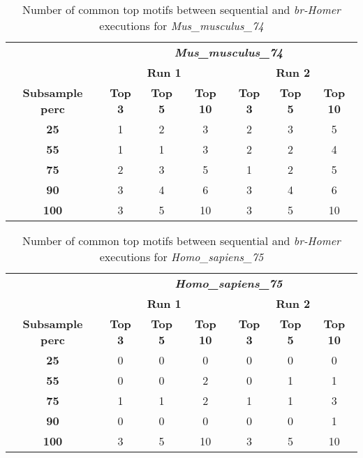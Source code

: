 \documentclass{acm_proc_article-sp}
\begin{document}
\begin{table*}[h]
\centering
\begin{tabular}{c|c|c|c|c|c|c|}
\cline{2-7}
\textbf{} & \multicolumn{6}{c|}{\textit{\textbf{Mus\_musculus\_74}}} \\ \cline{2-7} 
\textbf{} & \multicolumn{3}{c|}{\textbf{Run 1}} & \multicolumn{3}{c|}{\textbf{Run 2}} \\ \hline
\multicolumn{1}{|c|}{\textbf{Subsample perc}} & \textbf{Top 3} & \textbf{Top 5} & \textbf{Top 10} & \textbf{Top 3} & \textbf{Top 5} & \textbf{Top 10} \\ \hline
\multicolumn{1}{|c|}{\textbf{25}} & 1 & 2 & 3 & 2 & 3 & 5 \\ \hline
\multicolumn{1}{|c|}{\textbf{55}} & 1 & 1 & 3 & 2 & 2 & 4 \\ \hline
\multicolumn{1}{|c|}{\textbf{75}} & 2 & 3 & 5 & 1 & 2 & 5 \\ \hline
\multicolumn{1}{|c|}{\textbf{90}} & 3 & 4 & 6 & 3 & 4 & 6 \\ \hline
\multicolumn{1}{|c|}{\textbf{100}} & 3 & 5 & 10 & 3 & 5 & 10 \\ \hline
\end{tabular}
\caption{Number of common top motifs between sequential and \textit{br-Homer} executions for \textit{Mus\_musculus\_74}}
\end{table*}


\begin{table*}[h]
\centering
\begin{tabular}{c|c|c|c|c|c|c|}
\cline{2-7}
\textbf{} & \multicolumn{6}{c|}{\textit{\textbf{Homo\_sapiens\_75}}} \\ \cline{2-7} 
\textbf{} & \multicolumn{3}{c|}{\textbf{Run 1}} & \multicolumn{3}{c|}{\textbf{Run 2}} \\ \hline
\multicolumn{1}{|c|}{\textbf{Subsample perc}} & \textbf{Top 3} & \textbf{Top 5} & \textbf{Top 10} & \textbf{Top 3} & \textbf{Top 5} & \textbf{Top 10} \\ \hline
\multicolumn{1}{|c|}{\textbf{25}} & 0 & 0 & 0 & 0 & 0 & 0 \\ \hline
\multicolumn{1}{|c|}{\textbf{55}} & 0 & 0 & 2 & 0 & 1 & 1 \\ \hline
\multicolumn{1}{|c|}{\textbf{75}} & 1 & 1 & 2 & 1 & 1 & 3 \\ \hline
\multicolumn{1}{|c|}{\textbf{90}} & 0 & 0 & 0 & 0 & 0 & 1 \\ \hline
\multicolumn{1}{|c|}{\textbf{100}} & 3 & 5 & 10 & 3 & 5 & 10 \\ \hline
\end{tabular}
\caption{Number of common top motifs between sequential and \textit{br-Homer} executions for \textit{Homo\_sapiens\_75}}
\end{table*}
\end{document}
